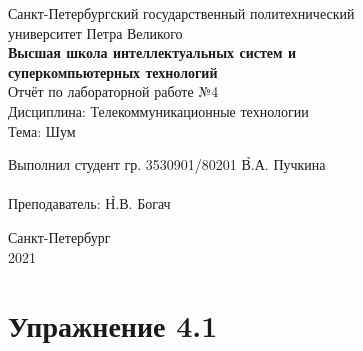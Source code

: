 \documentclass[a4paper, 14pt]{extarticle}
\begin{document}
    \begin{center}
        \begin{center}
            \hfill \break
            \normalsize{Санкт-Петербургский государственный политехнический}\\
            \normalsize{университет Петра Великого}\\
            \hfill \break
            \normalsize{\textbf{Высшая школа интеллектуальных систем и}}\\
            \normalsize{\textbf{суперкомпьютерных технологий}}\\
            \hfill \break
            \hfill \break
            \hfill \break
            \hfill \break
            \hfill \break
            \normalsize{Отчёт по лабораторной работе №4}\\
            \normalsize{Дисциплина: Телекоммуникационные технологии}\\
            \normalsize{Тема: Шум}\\
        \end{center}
        \hfill \break
        \hfill \break
        \hfill \break
        \hfill \break
        \hfill \break
        \hfill \break
        \hfill \break
        \hfill \break
        \hfill \break
        \hfill \break
        \begin{tabbing}
            Выполнил студент гр. 3530901/80201 \`В.А. Пучкина\\
            \\
            Преподаватель: \`Н.В. Богач\\
        \end{tabbing}
        \hfill \break
        \hfill \break
        \hfill \break
        \hfill \break
        \begin{center}
            Санкт-Петербург\\
            2021
        \end{center}
        \thispagestyle{empty}
    \end{center}

    \newpage
    \tableofcontents

    \newpage
    \listoffigures

    \newpage
    \lstlistoflistings

    \newpage
    \section{Упражнение 4.1}
    \label{sec:task1}
\end{document}
